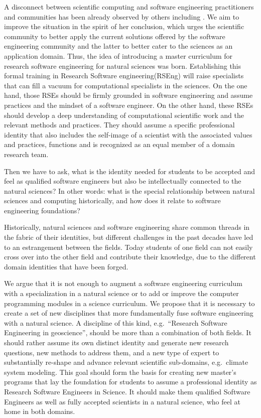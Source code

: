 \documentclass[
        twocolumn,german,biblatex
    ]{article}
\begin{document}
    A disconnect between scientific computing and software engineering
    practitioners and communities has been already observed by others
    including \textcite{Kelly2007}. We aim to improve the situation in
    the spirit of her conclusion, which urges the scientific community
    to better apply the current solutions offered by the software
    engineering community and the latter to better cater to the sciences
    as an application domain. Thus, the idea of introducing a master
    curriculum for research software engineering for natural sciences
    was born. Establishing this formal training in Research Software
    engineering(RSEng) will raise specialists that can fill a vacuum for
    computational specialists in the sciences. On the one hand, those
    RSEs should be firmly grounded in software engineering and assume
    practices and the mindset of a software engineer. On the other hand,
    these RSEs should develop a deep understanding of computational
    scientific work and the relevant methods and practices. They should
    assume a specific professional identity that also includes the
    self-image of a scientist with the associated values and practices,
    functions and is recognized as an equal member of a domain research
    team.

    Then we have to ask, what is the identity needed for students to be
    accepted and feel as qualified software engineers but also be
    intellectually connected to the natural sciences? In other words:
    what is the special relationship between natural sciences and
    computing historically, and how does it relate to software
    engineering foundations?

    Historically, natural sciences and software engineering share common
    threads in the fabric of their identities, but different challenges
    in the past decades have led to an estrangement between the fields.
    Today students of one field can not easily cross over into the other
    field and contribute their knowledge, due to the different domain
    identities that have been forged.

    We argue that it is not enough to augment a software engineering
    curriculum with a specialization in a natural science or to add or
    improve the computer programming modules in a science curriculum. We
    propose that it is necessary to create a set of new disciplines that
    more fundamentally fuse software engineering with a natural science.
    A discipline of this kind, e.g.~``Research Software Engineering in
    geoscience'', should be more than a combination of both fields. It
    should rather assume its own distinct identity and generate new
    research questions, new methods to address them, and a new type of
    expert to substantially re-shape and advance relevant scientific
    sub-domains, e.g.~climate system modeling. This goal should form the
    basis for creating new master's programs that lay the foundation for
    students to assume a professional identity as Research Software
    Engineers in Science. It should make them qualified Software
    Engineers as well as fully accepted scientists in a natural science,
    who feel at home in both domains.
\end{document}
